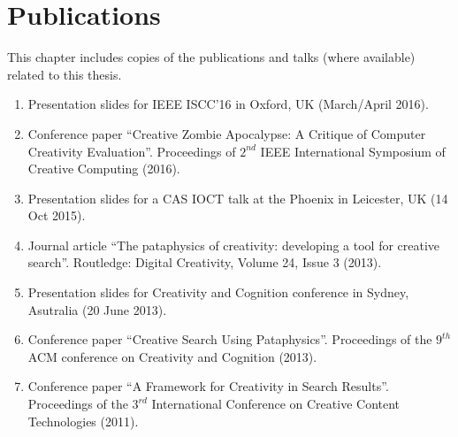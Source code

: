 
\chapter{Publications}
\label{app:pub}

\vspace{5cm}


This chapter includes copies of the publications and talks (where available) related to this thesis.




\begin{enumerate}
  \item Presentation slides for IEEE ISCC'16 in Oxford, UK (March/April 2016).
  \item Conference paper ``Creative Zombie Apocalypse: A Critique of Computer Creativity Evaluation''. Proceedings of $2^{nd}$ IEEE International Symposium of Creative Computing (2016).
  \item Presentation slides for a \ac{CAS} \ac{IOCT} talk at the Phoenix in Leicester, UK (14 Oct 2015).
  \item Journal article ``The pataphysics of creativity: developing a tool for creative search''. Routledge: Digital Creativity, Volume 24, Issue 3 (2013).
  \item Presentation slides for Creativity and Cognition conference in Sydney, Asutralia (20 June 2013).
  \item Conference paper ``Creative Search Using Pataphysics''. Proceedings of the $9^{th}$ ACM conference on Creativity and Cognition (2013).
  \item Conference paper ``A Framework for Creativity in Search Results''. Proceedings of the $3^{rd}$ International Conference on Creative Content Technologies (2011).
\end{enumerate}

\addtocounter{section}{1}


